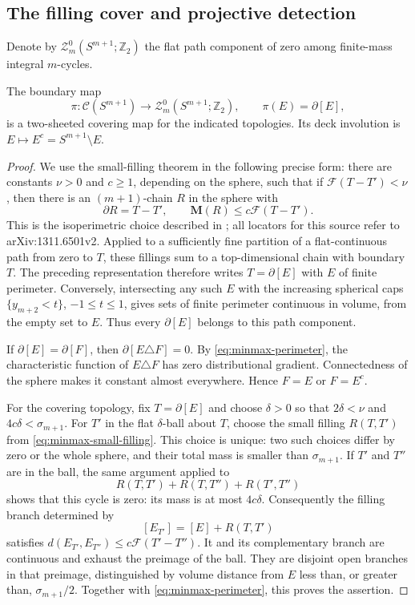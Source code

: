 \subsection{The filling cover and projective detection}

Denote by $\mathcal Z_m^0(S^{m+1};\mathbb Z_2)$ the flat path component
of zero among finite-mass integral $m$-cycles.

\begin{lemma}\label{lem:minmax-cover}
The boundary map
\[
 \pi:\mathcal C(S^{m+1})\longrightarrow
 \mathcal Z_m^0(S^{m+1};\mathbb Z_2),\qquad
 \pi(E)=\partial[E],
\]
is a two-sheeted covering map for the indicated topologies. Its deck
involution is $E\mapsto E^c=S^{m+1}\setminus E$.
\end{lemma}

\begin{proof}
We use the small-filling theorem in the following precise form: there
are constants $\nu>0$ and $c\ge1$, depending on the sphere, such that
if $\mathcal F(T-T')<\nu$, then there is an $(m+1)$-chain $R$ in
the sphere with
\begin{equation}\label{eq:minmax-small-filling}
 \partial R=T-T',\qquad
 \mathbf M(R)\le c\mathcal F(T-T').
\end{equation}
This is the isoperimetric choice described in
\cite[\S3.1, p.~11]{MarquesNeves2017}; all locators for this source
refer to arXiv:1311.6501v2. Applied to a sufficiently fine partition of
a flat-continuous path from zero to $T$, these fillings sum to a
top-dimensional chain with boundary $T$. The preceding representation
therefore writes $T=\partial[E]$ with $E$ of finite perimeter.
Conversely, intersecting any such $E$ with the increasing spherical
caps $\{y_{m+2}<t\}$, $-1\le t\le1$, gives sets of finite perimeter
continuous in volume, from the empty set to $E$. Thus every
$\partial[E]$ belongs to this path component.

If $\partial[E]=\partial[F]$, then
$\partial[E\triangle F]=0$. By \eqref{eq:minmax-perimeter}, the
characteristic function of $E\triangle F$ has zero distributional
gradient. Connectedness of the sphere makes it constant almost
everywhere. Hence $F=E$ or $F=E^c$.

For the covering topology, fix $T=\partial[E]$ and choose $\delta>0$
so that $2\delta<\nu$ and $4c\delta<\sigma_{m+1}$. For
$T'$ in the flat $\delta$-ball about $T$, choose the small filling
$R(T,T')$ from \eqref{eq:minmax-small-filling}. This choice is unique:
two such choices differ by zero or the whole sphere, and their total
mass is smaller than $\sigma_{m+1}$. If $T'$ and $T''$ are in the
ball, the same argument applied to
\[
 R(T,T')+R(T,T'')+R(T',T'')
\]
shows that this cycle is zero: its mass is at most $4c\delta$.
Consequently the filling branch determined by
\[
 [E_{T'}]=[E]+R(T,T')
\]
satisfies
$d(E_{T'},E_{T''})\le c\mathcal F(T'-T'')$.
It and its complementary branch are continuous and exhaust the
preimage of the ball. They are disjoint open branches in that
preimage, distinguished by volume distance from $E$ less than, or
greater than, $\sigma_{m+1}/2$. Together with
\eqref{eq:minmax-perimeter}, this proves the assertion.
\end{proof}

